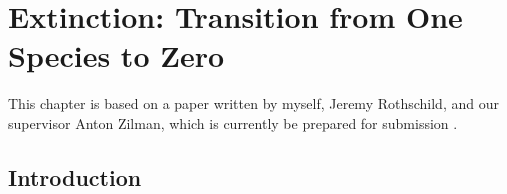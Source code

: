 \chapter{Extinction: Transition from One Species to Zero}%




This chapter is based on a paper written by myself, Jeremy Rothschild, and our supervisor Anton Zilman, which is currently be prepared for submission \cite{Badali2019b}. 

\section{Introduction} \label{Introduction}%


